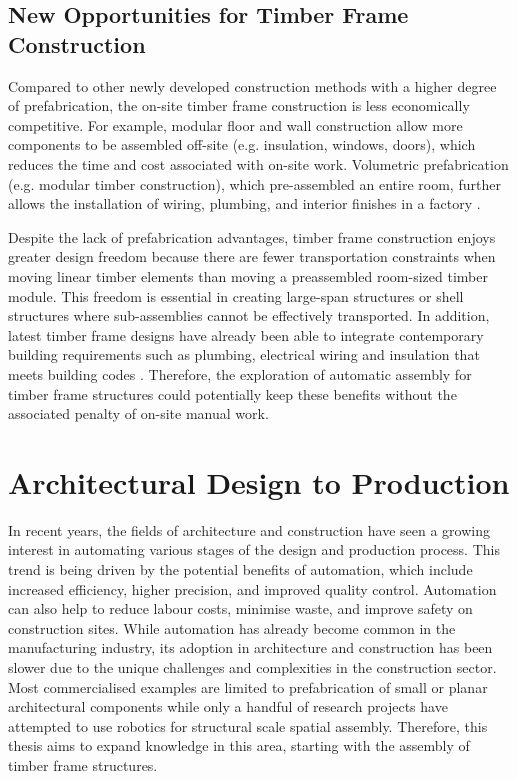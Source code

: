\subsection{New Opportunities for Timber Frame Construction}

Compared to other newly developed construction methods with a higher degree of prefabrication, the on-site timber frame construction is less economically competitive. For example, modular floor and wall construction allow more components to be assembled off-site (e.g. insulation, windows, doors), which reduces the time and cost associated with on-site work. Volumetric prefabrication (e.g. modular timber construction), which pre-assembled an entire room, further allows the installation of wiring, plumbing, and interior finishes in a factory \parencite{adelDesignRoboticallyFabricated2018}. 

Despite the lack of prefabrication advantages, timber frame construction enjoys greater design freedom because there are fewer transportation constraints when moving linear timber elements than moving a preassembled room-sized timber module. This freedom is essential in creating large-span structures or shell structures where sub-assemblies cannot be effectively transported. In addition, latest timber frame designs have already been able to integrate contemporary building requirements such as plumbing, electrical wiring and insulation that meets building codes \parencite{bensonTimberframeHomeDesign1988}. Therefore, the exploration of automatic assembly for timber frame structures could potentially keep these benefits without the associated penalty of on-site manual work.

\section{Architectural Design to Production}

In recent years, the fields of architecture and construction have seen a growing interest in automating various stages of the design and production process. This trend is being driven by the potential benefits of automation, which include increased efficiency, higher precision, and improved quality control. Automation can also help to reduce labour costs, minimise waste, and improve safety on construction sites. While automation has already become common in the manufacturing industry, its adoption in architecture and construction has been slower due to the unique challenges and complexities in the construction sector. Most commercialised examples are limited to prefabrication of small or planar architectural components while only a handful of research projects have attempted to use robotics for structural scale spatial assembly. Therefore, this thesis aims to expand knowledge in this area, starting with the assembly of timber frame structures.

